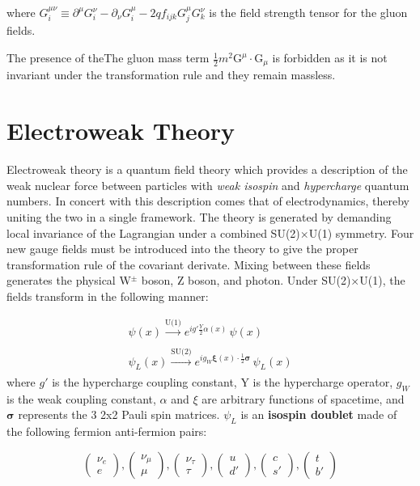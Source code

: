 where $G^{\mu\nu}_{i} \equiv \partial^{\mu} G^{\nu}_{i} - \partial_{\nu} G^{\mu}_{i} - 2 q f_{ijk} G^{\mu}_{j} G^{\nu}_{k}$ is the field strength tensor for the gluon fields.

The presence of theThe gluon mass term $\frac{1}{2}m^{2}\bm{\mathrm{G}}^{\mu} \cdot \bm{\mathrm{G}}_{\mu}$ is forbidden as it is not invariant under the transformation rule and they remain massless.

\section{Electroweak Theory}

Electroweak theory is a quantum field theory which provides a description of the weak nuclear force between particles with \textit{weak isospin} and \textit{hypercharge} quantum numbers. In concert with this description comes that of electrodynamics, thereby uniting the two in a single framework. The theory is generated by demanding local invariance of the Lagrangian under a combined SU(2)$\times$U(1) symmetry. Four new gauge fields must be introduced into the theory to give the proper transformation rule of the covariant derivate. Mixing between these fields generates the physical W$^{\pm}$ boson, Z boson, and photon. Under SU(2)$\times$U(1), the fields transform in the following manner:

\begin{equation}
\begin{array}{l}
\psi(x) \xrightarrow[]{\text{U(1)}} e^{i g' \frac{Y}{2} \alpha(x)} \, \psi(x) \\
\psi_{L}(x) \xrightarrow[]{\text{SU(2)}} e^{i g_{W} \bm{\xi}(x) \cdot \frac{1}{2} \bm{\sigma} } \, \psi_{L}(x) 
\end{array}
\end{equation}
where $g'$ is the hypercharge coupling constant, Y is the hypercharge operator, $g_{W}$ is the weak coupling constant, $\alpha$ and $\xi$ are arbitrary functions of spacetime, and $\bm{\sigma}$ represents the 3 2x2 Pauli spin matrices. $\psi_{L}$ is an \textbf{isospin doublet} made of the following fermion anti-fermion pairs:

\begin{equation*}
\begin{pmatrix} \nu_{e} \\ e \end{pmatrix},
\begin{pmatrix} \nu_{\mu} \\ \mu \end{pmatrix},
\begin{pmatrix} \nu_{\tau} \\ \tau \end{pmatrix},
\begin{pmatrix} u \\ d' \end{pmatrix},
\begin{pmatrix} c \\ s' \end{pmatrix},
\begin{pmatrix} t \\ b' \end{pmatrix}
\end{equation*}

